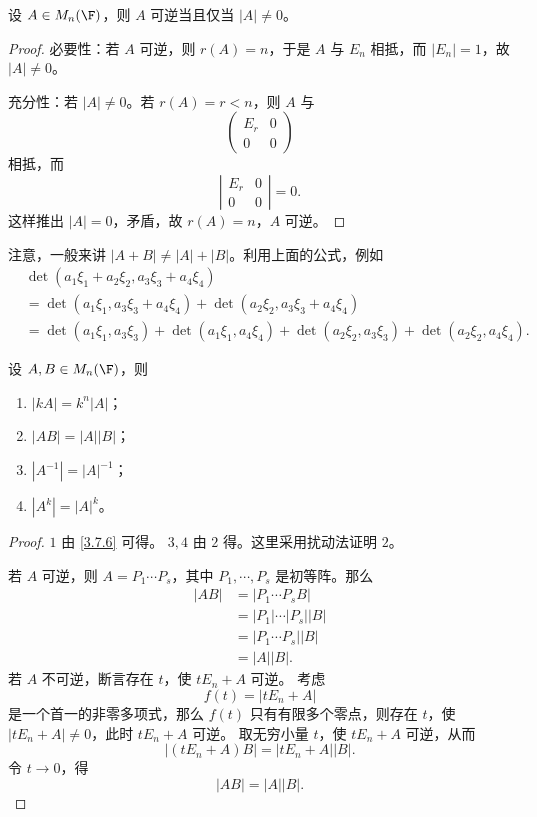 \begin{theorem}\label{3.7.9}
	设 $A\in M_n(\F)$，则 $A$ 可逆当且仅当 $|A|\neq0$。
\end{theorem}

\begin{proof}
	必要性：若 $A$ 可逆，则 $r(A)=n$，于是 $A$ 与 $E_n$ 相抵，而 $|E_n|=1$，故 $|A|\neq0$。
	
	充分性：若 $|A|\neq0$。若 $r(A)=r<n$，则 $A$ 与
	\[
	\begin{pmatrix}
		E_r&0\\
		0&0
	\end{pmatrix}
	\]
	相抵，而
	\[
	\left|
	\begin{matrix}
		E_r&0\\
		0&0
	\end{matrix}
	\right|=0.
	\]
	这样推出 $|A|=0$，矛盾，故 $r(A)=n$，$A$ 可逆。
\end{proof}

注意，一般来讲 $|A+B|\neq |A|+|B|$。利用上面的公式，例如
\[
\begin{aligned}
	&\det(a_1\xi_1+a_2\xi_2,
	a_3\xi_3+a_4\xi_4)\\
	&=\det(a_1\xi_1,
	a_3\xi_3+a_4\xi_4)
	+\det(a_2\xi_2,
	a_3\xi_3+a_4\xi_4)\\
	&=\det(a_1\xi_1,a_3\xi_3)
	+\det(a_1\xi_1,a_4\xi_4)
	+\det(a_2\xi_2,a_3\xi_3)
	+\det(a_2\xi_2,a_4\xi_4).
\end{aligned}
\]

\begin{proposition}\label{3.7.10}
	设 $A,B\in M_n(\F)$，则
	\begin{enumerate}
		\item $|kA|=k^n|A|$；
		\item $|AB|=|A||B|$；
		\item $|A^{-1}|=|A|^{-1}$；
		\item $|A^k|=|A|^k$。
	\end{enumerate}
\end{proposition}

\begin{proof}
	$1$ 由 \ref{3.7.6} 可得。
	$3,4$ 由 $2$ 得。这里采用扰动法证明 $2$。
	
	若 $A$ 可逆，则 $A=P_1\cdots P_s$，其中 $P_1,\cdots,P_s$ 是初等阵。那么
	\[
	\begin{aligned}
		|AB|&=|P_1\cdots P_sB|\\
		&=|P_1|\cdots|P_s||B|\\
		&=|P_1\cdots P_s||B|\\
		&=|A||B|.
	\end{aligned}
	\]
	若 $A$ 不可逆，断言存在 $t$，使 $tE_n+A$ 可逆。
	考虑
	\[
	f(t)=|tE_n+A|
	\]
	是一个首一的非零多项式，那么 $f(t)$ 只有有限多个零点，则存在 $t$，使 $|tE_n+A|\neq0$，此时 $tE_n+A$ 可逆。
	取无穷小量 $t$，使 $tE_n+A$ 可逆，从而
	\[
	|(tE_n+A)B|=|tE_n+A||B|.
	\]
	令 $t\to0$，得
	\[
	|AB|=|A||B|.
	\]
\end{proof}

